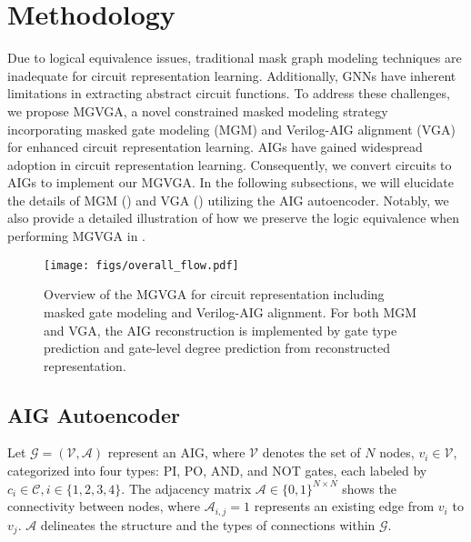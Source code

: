 \section{Methodology}
Due to logical equivalence issues, traditional mask graph modeling techniques are inadequate for circuit representation learning. 
Additionally, GNNs have inherent limitations in extracting abstract circuit functions. 
To address these challenges, we propose MGVGA, a novel constrained masked modeling strategy incorporating masked gate modeling (MGM) and Verilog-AIG alignment (VGA) for enhanced circuit representation learning.
AIGs have gained widespread adoption in circuit representation learning. 
Consequently, we convert circuits to AIGs to implement our MGVGA.
In the following subsections, we will elucidate the details of MGM () and VGA () utilizing the AIG autoencoder.
Notably, we also provide a detailed illustration of how we preserve the logic equivalence when performing MGVGA in .
\begin{figure*}[tb!]
    \centering
    \texttt{[image: figs/overall\_flow.pdf]} 
    \caption{Overview of the MGVGA for circuit representation including masked gate modeling and Verilog-AIG alignment. For both MGM and VGA, the AIG reconstruction is implemented by gate type prediction and gate-level degree prediction from reconstructed representation.}
    \label{fig:crl}
\end{figure*}

\subsection{AIG Autoencoder}
Let $\mathcal{G} = (\mathcal{V}, \mathcal{A})$ represent an AIG, where $\mathcal{V}$ denotes the set of $N$ nodes, $v_i \in \mathcal{V}$, categorized into four types: PI, PO, AND, and NOT gates, each labeled by $c_{i} \in \mathcal{C}, i\in\{1,2,3,4\}$. 
The adjacency matrix $\mathcal{A} \in \{0, 1\}^{N \times N}$ shows the connectivity between nodes, where $\mathcal{A}_{i, j} = 1$ represents an existing edge from $v_i$ to $v_j$. 
$\mathcal{A}$ delineates the structure and the types of connections within $\mathcal{G}$.

